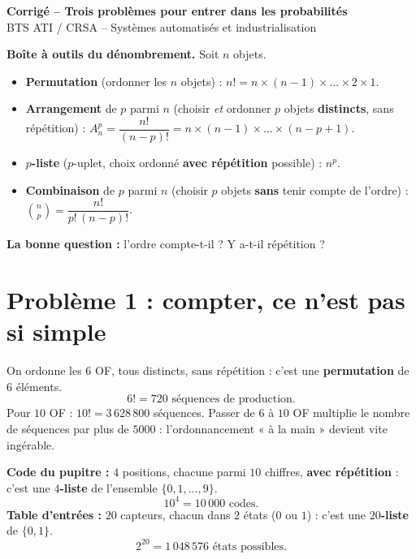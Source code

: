 \documentclass[a4paper,11pt]{article}
\begin{document}
\begin{tcolorbox}[colback=uimmblue, colframe=uimmblue, sharp corners, boxrule=0pt,
  left=14pt, right=14pt, top=10pt, bottom=10pt]
{\color{white}\LARGE\bfseries Corrigé -- Trois problèmes pour entrer dans les probabilités}\\[4pt]
{\color{white}\large BTS ATI / CRSA -- Systèmes automatisés et industrialisation}
\end{tcolorbox}

\vspace{4pt}
\begin{notion}
\textbf{Boîte à outils du dénombrement.} Soit $n$ objets.
\begin{itemize}
  \item \textbf{Permutation} (ordonner les $n$ objets) : $n! = n\times(n-1)\times\dots\times 2\times 1$.
  \item \textbf{Arrangement} de $p$ parmi $n$ (choisir \emph{et} ordonner $p$ objets \textbf{distincts}, sans répétition) : $A_n^p = \dfrac{n!}{(n-p)!} = n\times(n-1)\times\dots\times(n-p+1)$.
  \item \textbf{$p$-liste} ($p$-uplet, choix ordonné \textbf{avec répétition} possible) : $n^p$.
  \item \textbf{Combinaison} de $p$ parmi $n$ (choisir $p$ objets \textbf{sans} tenir compte de l'ordre) : $\displaystyle \binom{n}{p} = \dfrac{n!}{p!\,(n-p)!}$.
\end{itemize}
\textbf{La bonne question :} l'ordre compte-t-il ? \; Y a-t-il répétition ?
\end{notion}

\section{Problème 1 : compter, ce n'est pas si simple}

\begin{correction}
On ordonne les $6$ OF, tous distincts, sans répétition : c'est une \textbf{permutation} de $6$ éléments.
\[
6! = 720 \text{ séquences de production.}
\]
Pour $10$ OF : $10! = 3\,628\,800$ séquences. Passer de $6$ à $10$ OF multiplie le nombre de séquences par plus de $5000$ : l'ordonnancement « à la main » devient vite ingérable.
\end{correction}

\begin{correction}
\textbf{Code du pupitre :} $4$ positions, chacune parmi $10$ chiffres, \textbf{avec répétition} : c'est une \textbf{$4$-liste} de l'ensemble $\{0,1,\dots,9\}$.
\[
10^4 = 10\,000 \text{ codes.}
\]
\textbf{Table d'entrées :} $20$ capteurs, chacun dans $2$ états ($0$ ou $1$) : c'est une \textbf{$20$-liste} de $\{0,1\}$.
\[
2^{20} = 1\,048\,576 \text{ états possibles.}
\]
\end{correction}
\end{document}

